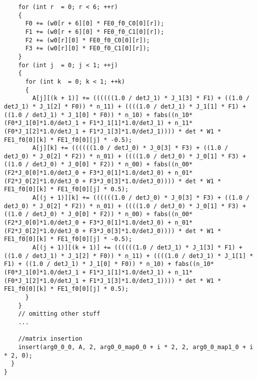 \documentclass[a4paper]{article}
\begin{document}
\begin{appendices}
\begin{lstlisting}
    for (int r  = 0; r < 6; ++r)
    {
      F0 += (w0[r + 6][0] * FE0_f0_C0[0][r]);
      F1 += (w0[r + 6][0] * FE0_f0_C1[0][r]);
      F2 += (w0[r][0] * FE0_f0_C0[0][r]);
      F3 += (w0[r][0] * FE0_f0_C1[0][r]);      
    }
    for (int j  = 0; j < 1; ++j)
    {
      for (int k  = 0; k < 1; ++k)
      {
        A[j][(k + 1)] += ((((((1.0 / detJ_1) * J_1[3] * F1) + ((1.0 / detJ_1) * J_1[2] * F0)) * n_11) + ((((1.0 / detJ_1) * J_1[1] * F1) + ((1.0 / detJ_1) * J_1[0] * F0)) * n_10) + fabs((n_10*(F0*J_1[0]*1.0/detJ_1 + F1*J_1[1]*1.0/detJ_1) + n_11*(F0*J_1[2]*1.0/detJ_1 + F1*J_1[3]*1.0/detJ_1)))) * det * W1 * FE1_f0[0][k] * FE1_f0[0][j] * -0.5);
        A[j][k] += ((((((1.0 / detJ_0) * J_0[3] * F3) + ((1.0 / detJ_0) * J_0[2] * F2)) * n_01) + ((((1.0 / detJ_0) * J_0[1] * F3) + ((1.0 / detJ_0) * J_0[0] * F2)) * n_00) + fabs((n_00*(F2*J_0[0]*1.0/detJ_0 + F3*J_0[1]*1.0/detJ_0) + n_01*(F2*J_0[2]*1.0/detJ_0 + F3*J_0[3]*1.0/detJ_0)))) * det * W1 * FE1_f0[0][k] * FE1_f0[0][j] * 0.5);
        A[(j + 1)][k] += ((((((1.0 / detJ_0) * J_0[3] * F3) + ((1.0 / detJ_0) * J_0[2] * F2)) * n_01) + ((((1.0 / detJ_0) * J_0[1] * F3) + ((1.0 / detJ_0) * J_0[0] * F2)) * n_00) + fabs((n_00*(F2*J_0[0]*1.0/detJ_0 + F3*J_0[1]*1.0/detJ_0) + n_01*(F2*J_0[2]*1.0/detJ_0 + F3*J_0[3]*1.0/detJ_0)))) * det * W1 * FE1_f0[0][k] * FE1_f0[0][j] * -0.5);
        A[(j + 1)][(k + 1)] += ((((((1.0 / detJ_1) * J_1[3] * F1) + ((1.0 / detJ_1) * J_1[2] * F0)) * n_11) + ((((1.0 / detJ_1) * J_1[1] * F1) + ((1.0 / detJ_1) * J_1[0] * F0)) * n_10) + fabs((n_10*(F0*J_1[0]*1.0/detJ_1 + F1*J_1[1]*1.0/detJ_1) + n_11*(F0*J_1[2]*1.0/detJ_1 + F1*J_1[3]*1.0/detJ_1)))) * det * W1 * FE1_f0[0][k] * FE1_f0[0][j] * 0.5);        
      }      
    }
    // omitting other stuff
    ...
    
    //matrix insertion
    insert(arg0_0_0, A, 2, arg0_0_map0_0 + i * 2, 2, arg0_0_map1_0 + i * 2, 0);
  }
}


\end{lstlisting}

\end{appendices}



%
%
\end{document}
